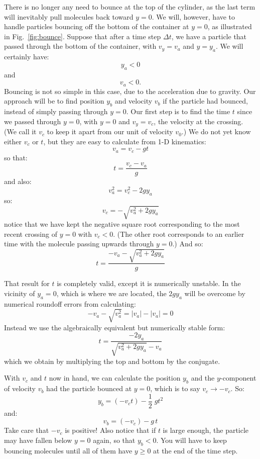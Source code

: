 \documentclass[12pt]{article}
\begin{document}
There is no longer any need to bounce at the top of the cylinder, as
the last term will inevitably pull molecules back toward $y=0$.  We
will, however, have to handle particles bouncing off the bottom of the
container at $y = 0$, as illustrated in Fig.~\ref{fig:bounce}.
Suppose that after a time step $\Delta t$, we have a particle that
passed through the bottom of the container, with $v_y = v_a$ and $y =
y_a$.  We will certainly have:
$$y_a < 0$$
and
$$v_a < 0.$$ Bouncing is not so simple in this case, due to the
acceleration due to gravity.  Our approach will be to find position
$y_b$ and velocity $v_b$ if the particle had bounced, instead of
simply passing through $y=0$.  Our first step is to find the time $t$
since we passed through $y=0$, with $y = 0$ and $v_y = v_c$, the
velocity at the crossing.  (We call it $v_c$ to keep it apart from our
unit of velocity $v_0$.)  We do not yet know either $v_c$ or $t$, but
they are easy to calculate from 1-D kinematics:
$$v_a = v_c - gt$$
so that:
$$t = \frac{v_c - v_a}{g}$$
and also:
$$v_a^2 = v_c^2 - 2 g y_a$$
so:
$$v_c = - \sqrt{v_a^2 + 2 g y_a}$$
notice that we have kept the negative square root corresponding to the most
recent crossing of $y=0$ with $v_c < 0$.  (The other root corresponds
to an earlier time with the molecule passing upwards through $y=0$.)
And so:
$$t = \frac{-v_a-\sqrt{v_a^2 + 2 g y_a}}{g}$$

That result for $t$ is completely valid, except it is numerically
unstable.  In the vicinity of $y_a=0$, which is where we are located, the $2 g y_a$ will be overcome by numerical roundoff errors from calculating:
$$-v_a-\sqrt{v_a^2} = |v_a| - |v_a| = 0$$
Instead we use the algebraically equivalent but numerically stable form:
\begin{equation}
t = \frac{- 2 y_a}{\sqrt{v_a^2 + 2 g y_a} - v_a}
\end{equation}
which we obtain by multiplying the top and bottom by the conjugate.

With $v_c$ and $t$ now in hand, we can calculate the position $y_b$ and the
$y$-component of velocity $v_b$ had the particle bounced at $y=0$, which is to say $v_c \to -v_c$.  So:
\begin{equation}
y_b = (-v_c t) - \frac{1}{2}\; g t^2
\end{equation}
and:
\begin{equation}
v_b = (-v_c) - g\,t
\end{equation}
Take care that $-v_c$ is positive!  Also notice that if $t$ is large
enough, the particle may have fallen below $y=0$ again, so that $y_b<0$.
You will have to keep bouncing molecules until all of them have $y \ge
0$ at the end of the time step.
\end{document}
